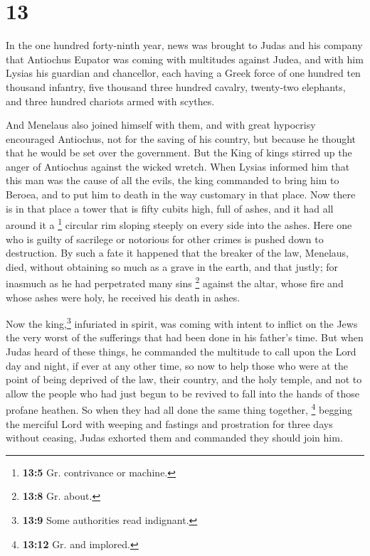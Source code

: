 \hypertarget{section-12}{%
\section{13}\label{section-12}}

 In the one hundred forty-ninth year, news was brought to
Judas and his company that Antiochus Eupator was coming with multitudes
against Judea,  and with him Lysias his guardian and
chancellor, each having a Greek force of one hundred ten thousand
infantry, five thousand three hundred cavalry, twenty-two elephants, and
three hundred chariots armed with scythes.

 And Menelaus also joined himself with them, and with
great hypocrisy encouraged Antiochus, not for the saving of his country,
but because he thought that he would be set over the government.
 But the King of kings stirred up the anger of Antiochus
against the wicked wretch. When Lysias informed him that this man was
the cause of all the evils, the king commanded to bring him to Beroea,
and to put him to death in the way customary in that place.
 Now there is in that place a tower that is fifty cubits
high, full of ashes, and it had all around it a \footnote{\textbf{13:5}
  Gr. contrivance or machine.} circular rim sloping steeply on every
side into the ashes.  Here one who is guilty of sacrilege
or notorious for other crimes is pushed down to destruction.
 By such a fate it happened that the breaker of the law,
Menelaus, died, without obtaining so much as a grave in the earth, and
that justly;  for inasmuch as he had perpetrated many sins
\footnote{\textbf{13:8} Gr. about.} against the altar, whose fire and
whose ashes were holy, he received his death in ashes.

 Now the king,\footnote{\textbf{13:9} Some authorities
  read indignant.} infuriated in spirit, was coming with intent to
inflict on the Jews the very worst of the sufferings that had been done
in his father's time.  But when Judas heard of these
things, he commanded the multitude to call upon the Lord day and night,
if ever at any other time, so now to help those who were at the point of
being deprived of the law, their country, and the holy temple,
 and not to allow the people who had just begun to be
revived to fall into the hands of those profane heathen. 
So when they had all done the same thing together, \footnote{\textbf{13:12}
  Gr. and implored.} begging the merciful Lord with weeping and fastings
and prostration for three days without ceasing, Judas exhorted them and
commanded they should join him.


